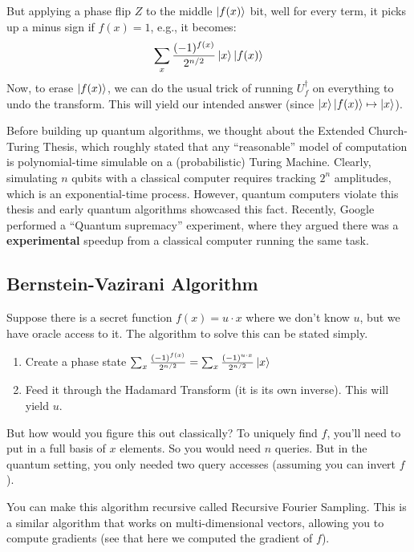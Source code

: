 But applying a phase flip $Z$ to the middle $\ket{f(x)}$ bit, well for every term, it picks up a minus sign if $f(x) = 1$, e.g.,
it becomes:
\[ \sum_x \frac{(-1)^{f(x)}}{2^{n/2}}\ket{x} \ket{f(x)} \]
Now, to erase $\ket{f(x)}$, we can do the usual trick of running $U_f^{\dagger}$ on everything to undo the transform. This will yield our intended answer (since $\ket{x} \ket{f(x)} \mapsto \ket{x}$).

Before building up quantum algorithms, we thought about the Extended Church-Turing Thesis, which roughly stated that any ``reasonable'' model of computation is
polynomial-time simulable on a (probabilistic) Turing Machine. Clearly, simulating $n$ qubits with a classical computer requires tracking $2^n$ amplitudes,
which is an exponential-time process. However, quantum computers violate this thesis and early quantum algorithms showcased this fact. Recently,
Google performed a ``Quantum supremacy'' experiment, where they argued there was a \textbf{experimental} speedup from a classical computer running the same task.

\subsection{Bernstein-Vazirani Algorithm}
Suppose there is a secret function $f(x) = u \cdot x$ where we don't know $u$,
but we have oracle access to it. The algorithm to solve this can be stated simply.

\begin{enumerate}
    \item Create a phase state $\sum_x \frac{(-1)^{f(x)}}{2^{n/2}} = \sum_x \frac{(-1)^{u \cdot x}}{2^{n/2}} \ket{x}$
    \item Feed it through the Hadamard Transform (it is its own inverse). This will yield $u$.
\end{enumerate}

But how would you figure this out classically? To uniquely find $f$, you'll need to put in a full basis of $x$ elements.
So you would need $n$ queries. But in the quantum setting, you only needed two query accesses (assuming you can invert $f$).

You can make this algorithm recursive called Recursive Fourier Sampling. This is a similar algorithm that works on
multi-dimensional vectors, allowing you to compute gradients (see that here we computed the gradient of $f$).

